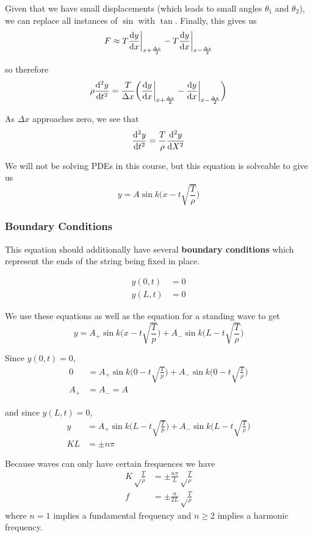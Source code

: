 \documentclass[12pt]{article}
\begin{document}
Given that we have small displacements (which leads to small angles $\theta_1$ and $\theta_2$), we can replace all instances of $\sin$ with $\tan$. Finally, this gives us \[ F \approx T\frac{{\rm d} y}{{\rm d} x} \bigg|_{x+\frac{\Delta x}{2}} - T\frac{{\rm d} y}{{\rm d} x} \bigg|_{x-\frac{\Delta x}{2}} \]

so therefore \[ \rho\frac{{\rm d}^2 y}{{\rm d} t^2} = \frac{T}{\Delta x} \bigg(\frac{{\rm d} y}{{\rm d} x} \bigg|_{x+\frac{\Delta x}{2}} - \frac{{\rm d} y}{{\rm d} x} \bigg|_{x-\frac{\Delta x}{2}}\bigg) \]

As $\Delta x$ approaches zero, we see that \[ \frac{{\rm d}^2 y}{{\rm d} t^2} = \frac{T}{\rho} \frac{{\rm d}^2 y}{{\rm d} X^2} \]

We will not be solving PDEs in this course, but this equation is solveable to give us \[ y = A\sin k\bigg(x - t\sqrt{\frac{T}{\rho}}\bigg) \]

\subsubsection{Boundary Conditions}
This equation should additionally have several {\bf boundary conditions} which represent the ends of the string being fixed in place.

\begin{align*}
y(0, t) &= 0\\
y(L, t) &= 0
\end{align*}

We use these equations as well as the equation for a standing wave to get \[ y = A_+ \sin k \bigg( x - t\sqrt{\frac{T}{p}} \bigg) + A_- \sin k \bigg( L - t\sqrt{\frac{T}{\rho}} \bigg) \]

Since $y(0, t) = 0$,
\begin{align*}
0 &= A_+ \sin k \bigg( 0 - t\sqrt{\frac{T}{p}} \bigg) + A_- \sin k \bigg( 0 - t\sqrt{\frac{T}{\rho}} \bigg)\\
A_+ &= A_- = A
\end{align*}

and since $y(L, t) = 0$,
\begin{align*}
y &= A_+ \sin k \bigg( L - t\sqrt{\frac{T}{p}} \bigg) + A_- \sin k \bigg( L - t\sqrt{\frac{T}{\rho}} \bigg)\\
KL &= \pm n\pi
\end{align*}

Because waves can only have certain frequences we have
\begin{align*}
K \sqrt\frac{T}{\rho} &= \pm \frac{n\pi}{L} \sqrt\frac{T}{\rho}\\
f &= \pm \frac{n}{2L} \sqrt\frac{T}{\rho}
\end{align*}
where $n = 1$ implies a fundamental frequency and $n \geq 2$ implies a harmonic frequency.
\end{document}
